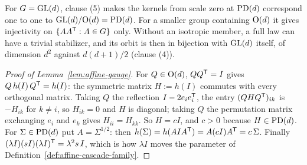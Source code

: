 For $G = \mathrm{GL}(d)$, clause (5) makes the kernels from scale zero at $\mathrm{PD}(d)$ correspond one to one to
$\mathrm{GL}(d)/\mathrm{O}(d) = \mathrm{PD}(d)$. For a smaller group containing $\mathrm{O}(d)$ it gives injectivity on
$\{AA^{\mathsf{T}} : A \in G\}$ only. Without an isotropic member, a full law can have a trivial
stabilizer, and its orbit is then in bijection with $\mathrm{GL}(d)$ itself, of dimension $d^2$ against
$d(d+1)/2$ (clause (4)).

\begin{proof}[Proof of Lemma~\ref{lem:affine-gauge}]
For $Q \in \mathrm{O}(d)$, $QQ^{\mathsf{T}} = I$ gives $Q\,h(I)\,Q^{\mathsf{T}} = h(I)$: the symmetric matrix
$H := h(I)$ commutes with every orthogonal matrix. Taking $Q$ the reflection
$I - 2e_ie_i^{\mathsf{T}}$, the entry $(QHQ^{\mathsf{T}})_{ik}$ is $-H_{ik}$ for $k \ne i$, so $H_{ik} = 0$ and
$H$ is diagonal; taking $Q$ the permutation matrix exchanging $e_i$ and $e_k$ gives
$H_{ii} = H_{kk}$. So $H = cI$, and $c > 0$ because $H \in \mathrm{PD}(d)$. For $\Sigma \in \mathrm{PD}(d)$ put
$A = \Sigma^{1/2}$: then $h(\Sigma) = h(AIA^{\mathsf{T}}) = A(cI)A^{\mathsf{T}} = c\,\Sigma$. Finally
$(\lambda I)(sI)(\lambda I)^{\mathsf{T}} = \lambda^2 s\,I$, which is how $\lambda I$ moves the parameter of
Definition~\ref{def:affine-cascade-family}.
\end{proof}

